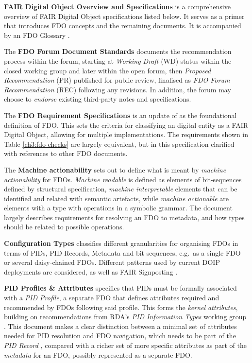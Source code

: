 \textbf{FAIR Digital Object Overview and Specifications} \cite{fdo-Overview} is a comprehensive overview of FAIR Digital Object specifications listed below. It serves as a primer that introduces FDO concepts and the remaining documents. It is accompanied by an FDO Glossary \cite{fdo-Glossary}.

The \textbf{FDO Forum Document Standards} \cite{fdo-DocProcessStd} documents the recommendation process within the forum, starting at \emph{Working Draft} (WD) status within the closed working group and later within the open forum, then \emph{Proposed Recommendation} (PR) published for public review, finalised as \emph{FDO Forum Recommendation} (REC) following any revisions. In addition, the forum may choose to \emph{endorse} existing third-party notes and specifications.

The \textbf{FDO Requirement Specifications} \cite{fdo-RequirementSpec} is an update of \cite{bonino2019} as the foundational definition of FDO. This sets the criteria for classifying an digital entity as a FAIR Digital Object, allowing for multiple implementations. The requirements shown in Table \vref{ch3:fdo-checks} are largely equivalent, but in this specification clarified with references to other FDO documents.

The \textbf{Machine actionability} \cite{fdo-MachineActionDef} sets out to define what is meant by \emph{machine actionability} for FDOs. \emph{Machine readable} is defined as elements of bit-sequences defined by structural specification, \emph{machine interpretable} elements that can be identified and related with semantic artefacts, while \emph{machine actionable} are elements with a type with operations in a symbolic grammar. The document largely describes requirements for resolving an FDO to metadata, and how types should be related to possible operations.

\textbf{Configuration Types} \cite{fdo-ConfigurationTypes} classifies different granularities for organising FDOs in terms of PIDs, PID Records, Metadata and bit sequences, e.g.~as a single FDO or several daisy-chained FDOs. Different patterns used by current DOIP deployments are considered, as well as FAIR Signposting \cite{vandesompel2015,Van de Sompel 2022}.

\textbf{PID Profiles \& Attributes} \cite{fdo-PIDProfileAttributes} specifies that PIDs must be formally associated with a \emph{PID Profile}, a separate FDO that defines attributes required and recommended by FDOs following said profile. This forms the \emph{kernel attributes}, building on recommendations from RDA's \emph{PID Information Types} working group \cite{weigelRDARecommendationPID2018}. This document makes a clear distinction between a minimal set of attributes needed for PID resolution and FDO navigation, which needs to be part of the \emph{PID Record} \cite{islam_2023}, compared with a richer set of more specific attributes as part of the \emph{metadata} for an FDO, possibly represented as a separate FDO.

